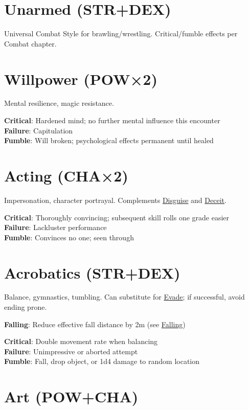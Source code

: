 \documentclass[10pt]{article}
\begin{document}
\section{Unarmed (STR+DEX)}
\label{skill:unarmed}

Universal Combat Style for brawling/wrestling. Critical/fumble effects per Combat chapter.

\section{Willpower (POW×2)}
\label{skill:willpower}

Mental resilience, magic resistance.

\textbf{Critical}: Hardened mind; no further mental influence this encounter\\
\textbf{Failure}: Capitulation\\
\textbf{Fumble}: Will broken; psychological effects permanent until healed


\section{Acting (CHA×2)}
\label{skill:acting}

Impersonation, character portrayal. Complements \hyperref[skill:disguise]{Disguise} and \hyperref[skill:deceit]{Deceit}.

\textbf{Critical}: Thoroughly convincing; subsequent skill rolls one grade easier\\
\textbf{Failure}: Lackluster performance\\
\textbf{Fumble}: Convinces no one; seen through

\section{Acrobatics (STR+DEX)}
\label{skill:acrobatics}

Balance, gymnastics, tumbling. Can substitute for \hyperref[skill:evade]{Evade}; if successful, avoid ending prone.

\textbf{Falling}: Reduce effective fall distance by 2m (see \hyperref[sec:falling]{Falling})

\textbf{Critical}: Double movement rate when balancing\\
\textbf{Failure}: Unimpressive or aborted attempt\\
\textbf{Fumble}: Fall, drop object, or 1d4 damage to random location

\section{Art (POW+CHA)}
\label{skill:art}
\end{document}
